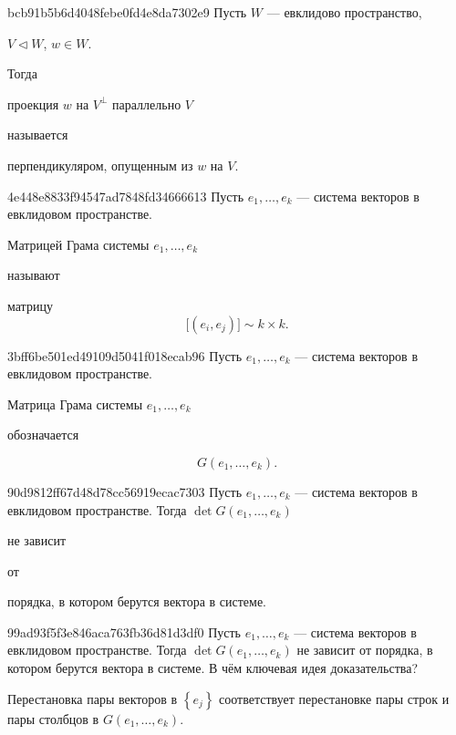 \begin{note}{bcb91b5b6d4048febe0fd4e8da7302e9}
    Пусть \({ W }\) --- евклидово пространство, \begin{icloze}{3}\({ V \triangleleft W }\), \({ w \in W }\).\end{icloze}
    Тогда \begin{icloze}{1}проекция \({ w }\) на \({ V^{\perp} }\) параллельно \({ V }\)\end{icloze} называется \begin{icloze}{2}перпендикуляром, опущенным из \({ w }\) на \({ V }\).\end{icloze}
\end{note}

\begin{note}{4e448e8833f94547ad7848fd34666613}
    Пусть \({ e_1, \ldots, e_k }\) --- система векторов в евклидовом пространстве.
    \begin{icloze}{2}Матрицей Грама системы \({ e_1, \ldots, e_k }\)\end{icloze} называют \begin{icloze}{1}матрицу
    \[
        \Big[ \left( e_i, e_j \right) \Big] \sim k \times k.
    \]\end{icloze}
\end{note}

\begin{note}{3bff6be501ed49109d5041f018ecab96}
    Пусть \({ e_1, \ldots, e_k }\) --- система векторов в евклидовом пространстве.
    \begin{icloze}{2}Матрица Грама системы \({ e_1, \ldots, e_k }\)\end{icloze} обозначается
    \begin{icloze}{1}
        \[
            G(e_1, \ldots, e_k).
        \]
    \end{icloze}
\end{note}

\begin{note}{90d9812ff67d48d78cc56919ecac7303}
    Пусть \({ e_1, \ldots, e_k }\) --- система векторов в евклидовом пространстве.
    Тогда \({ \det G(e_1, \ldots, e_k) }\) \begin{icloze}{2}не зависит\end{icloze} от \begin{icloze}{1}порядка, в котором берутся вектора в системе.\end{icloze}
\end{note}

\begin{note}{99ad93f5f3e846aca763fb36d81d3df0}
    Пусть \({ e_1, \ldots, e_k }\) --- система векторов в евклидовом пространстве.
    Тогда \({ \det G(e_1, \ldots, e_k) }\) не зависит от порядка, в котором берутся вектора в системе.
    В чём ключевая идея доказательства?

    \begin{cloze}{1}
        Перестановка пары векторов в \({ \left\{ e_j \right\} }\) соответствует перестановке пары строк и пары столбцов в \({ G(e_1, \ldots, e_k) }\).
    \end{cloze}
\end{note}

